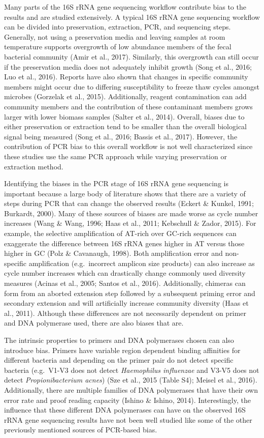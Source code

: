 \documentclass[12pt,]{article}
\begin{document}
Many parts of the 16S rRNA gene sequencing workflow contribute bias to
the results and are studied extensively. A typical 16S rRNA gene
sequencing workflow can be divided into preservation, extraction, PCR,
and sequencing steps. Generally, not using a preservation media and
leaving samples at room temperature supports overgrowth of low abundance
members of the fecal bacterial community (Amir et al., 2017). Similarly,
this overgrowth can still occur if the preservation media does not
adequately inhibit growth (Song et al., 2016; Luo et al., 2016). Reports
have also shown that changes in specific community members might occur
due to differing susceptibility to freeze thaw cycles amongst microbes
(Gorzelak et al., 2015). Additionally, reagent contamination can add
community members and the contribution of these contaminant members
grows larger with lower biomass samples (Salter et al., 2014). Overall,
biases due to either preservation or extraction tend to be smaller than
the overall biological signal being measured (Song et al., 2016; Bassis
et al., 2017). However, the contribution of PCR bias to this overall
workflow is not well characterized since these studies use the same PCR
approach while varying preservation or extraction method.

Identifying the biases in the PCR stage of 16S rRNA gene sequencing is
important because a large body of literature shows that there are a
variety of steps during PCR that can change the observed results (Eckert
\& Kunkel, 1991; Burkardt, 2000). Many of these sources of biases are
made worse as cycle number increases (Wang \& Wang, 1996; Haas et al.,
2011; Kebschull \& Zador, 2015). For example, the selective
amplification of AT-rich over GC-rich sequences can exaggerate the
difference between 16S rRNA genes higher in AT versus those higher in GC
(Polz \& Cavanaugh, 1998). Both amplification error and non-specific
amplification (e.g.~incorrect amplicon size products) can also increase
as cycle number increases which can drastically change commonly used
diversity measures (Acinas et al., 2005; Santos et al., 2016).
Additionally, chimeras can form from an aborted extension step followed
by a subsequent priming error and secondary extension and will
artificially increase community diversity (Haas et al., 2011). Although
these differences are not necessarily dependent on primer and DNA
polymerase used, there are also biases that are.

The intrinsic properties to primers and DNA polymerases chosen can also
introduce bias. Primers have variable region dependent binding
affinities for different bacteria and depending on the primer pair do
not detect specific bacteria (e.g.~V1-V3 does not detect
\emph{Haemophilus influenzae} and V3-V5 does not detect
\emph{Propionibacterium acnes}) (Sze et al., 2015 (Table S4); Meisel et
al., 2016). Additionally, there are multiple families of DNA polymerases
that have their own error rate and proof reading capacity (Ishino \&
Ishino, 2014). Interestingly, the influence that these different DNA
polymerases can have on the observed 16S rRNA gene sequencing results
have not been well studied like some of the other previously mentioned
sources of PCR-based bias.
\end{document}
